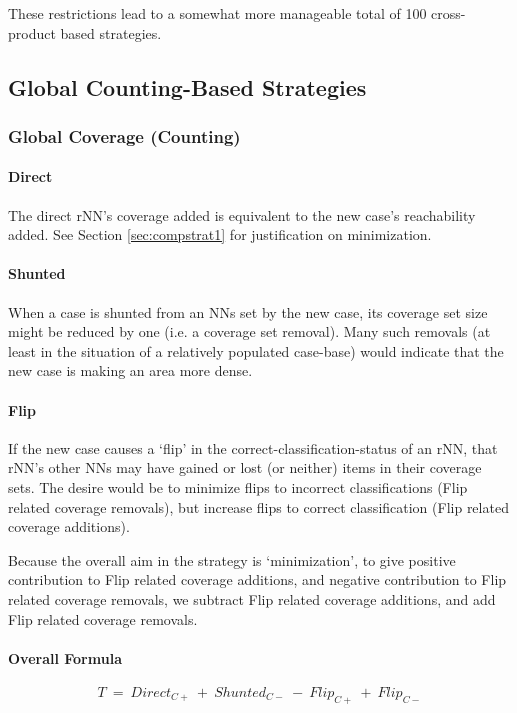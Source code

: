 \documentclass[a4paper,11pt]{report}
\begin{document}
These restrictions lead to a somewhat more manageable total of 100 cross-product based strategies.

\subsection{Global Counting-Based Strategies}

\subsubsection{Global Coverage (Counting)}

\paragraph{Direct}

The direct rNN's coverage added is equivalent to the new case's reachability added. See Section \ref{sec:compstrat1} for justification on minimization.

\paragraph{Shunted}

When a case is shunted from an NNs set by the new case, its coverage set size might be reduced by one (i.e. a coverage set removal). Many such removals (at least in the situation of a relatively populated case-base) would indicate that the new case is making an area more dense.

\paragraph{Flip}

If the new case causes a `flip' in the correct-classification-status of an rNN, that rNN's other NNs may have gained or lost (or neither) items in their coverage sets. The desire would be to minimize flips to incorrect classifications (Flip related coverage removals), but increase flips to correct classification (Flip related coverage additions).

Because the overall aim in the strategy is `minimization', to give positive contribution to Flip related coverage additions, and negative contribution to Flip related coverage removals, we subtract Flip related coverage additions, and add Flip related coverage removals.

\paragraph{Overall Formula}
\[  
  T~=~Direct_{C+}~+~Shunted_{C-}~-~Flip_{C+}~+~Flip_{C-}
\]
\end{document}
